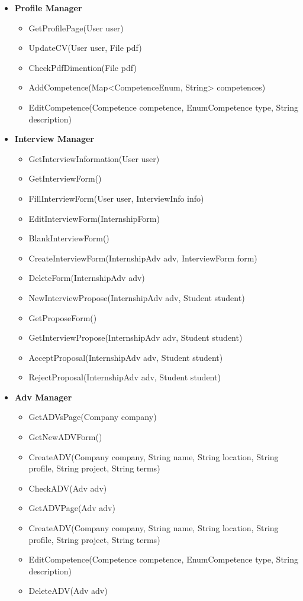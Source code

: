 \begin{itemize}
    \item \textbf{Profile Manager}
        \begin{itemize}
            \item GetProfilePage(User user)
            \item UpdateCV(User user, File pdf)
            \item CheckPdfDimention(File pdf)
            \item AddCompetence(Map<CompetenceEnum, String> competences)
            \item EditCompetence(Competence competence, EnumCompetence type, String description)
        \end{itemize}
        
    \item \textbf{Interview Manager}
        \begin{itemize}
            \item GetInterviewInformation(User user)
            \item GetInterviewForm()
            \item FillInterviewForm(User user, InterviewInfo info)
            \item EditInterviewForm(InternshipForm)
            \item BlankInterviewForm()
            \item CreateInterviewForm(InternshipAdv adv, InterviewForm form)
            \item DeleteForm(InternshipAdv adv)
            \item NewInterviewPropose(InternshipAdv adv, Student student)
            \item GetProposeForm()
            \item GetInterviewPropose(InternshipAdv adv, Student student)
            \item AcceptProposal(InternshipAdv adv, Student student)
            \item RejectProposal(InternshipAdv adv, Student student)
        \end{itemize}
        
    \item \textbf{Adv Manager}
        \begin{itemize}
            \item GetADVsPage(Company company)
            \item GetNewADVForm()
            \item CreateADV(Company company, String name, String location, String profile, String project, String terms)
            \item CheckADV(Adv adv)
            \item GetADVPage(Adv adv)
            \item CreateADV(Company company, String name, String location, String profile, String project, String terms)
            \item EditCompetence(Competence competence, EnumCompetence type, String description)
            \item DeleteADV(Adv adv)
        \end{itemize}
        

\end{itemize}
